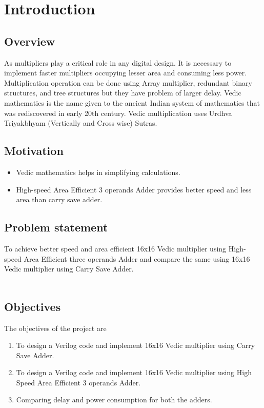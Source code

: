 \chapter{Introduction}

\section[Introduction]{\textbf{Overview}}
As multipliers play a critical role in any digital design. It is necessary to implement faster multipliers occupying lesser area and consuming less power. Multiplication operation can be done using Array multiplier, redundant binary structures, and tree structures but they have problem of larger delay. Vedic mathematics is the name given to the ancient Indian system of mathematics that was rediscovered in early 20th century. Vedic multiplication uses Urdhva Triyakbhyam (Vertically and Cross wise) Sutras. 


\section[Motivation]{\textbf{Motivation}}

\begin{itemize}
	\item Vedic mathematics helps in simplifying calculations.
	\item High-speed Area Efficient 3 operands Adder provides better speed and less area than carry save adder.\\
\end{itemize}

\section[Problem statement]{\textbf{Problem statement}}

To achieve better speed and area efficient 16x16 Vedic multiplier using High-speed Area Efficient three operands Adder and compare the same using 16x16 Vedic multiplier using Carry Save Adder.
\\
\\
\section[Objectives]{\textbf{Objectives}}
The objectives of the project are
\begin{enumerate}
\item To design a Verilog code and implement 16x16 Vedic multiplier using Carry Save Adder.
\item To design a Verilog code and implement 16x16 Vedic multiplier using High Speed Area Efficient 3 operands Adder.
\item Comparing delay and power consumption for both the adders.
\end{enumerate}

